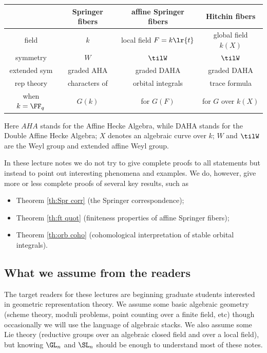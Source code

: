 \begin{table}
	\centering
		\begin{tabular}{|c|c|c|c|}
		\hline
		& Springer fibers & affine  Springer fibers & Hitchin fibers\\
		\hline
		field & $k$ & local field $F=k\lr{t}$ & global field $k(X)$\\
		\hline
		symmetry & $W$ & $\tilW$ &  $\tilW$\\
		\hline
		extended sym& graded AHA & graded DAHA & graded DAHA\\
		\hline
		rep theory & characters of  & orbital integrals &  trace formula \\
		when $k=\FF_{q}$ & $G(k)$ & for $G(F)$ & for $G$ over $k(X)$\\
		\hline
		\end{tabular}
\end{table}
Here $AHA$ stands for the Affine Hecke Algebra, while DAHA stands for the Double Affine Hecke Algebra; $X$ denotes an algebraic curve over $k$; $W$ and $\tilW$ are the Weyl group and extended affine Weyl group. 

In these lecture notes we do not try to give complete proofs to all statements but instead to point out interesting phenomena and examples. We do, however, give more or less complete proofs of several key results, such as 
\begin{itemize}
\item Theorem \ref{th:Spr corr} (the Springer correspondence);
\item Theorem \ref{th:ft quot} (finiteness properties of affine Springer fibers);
\item Theorem \ref{th:orb coho} (cohomological interpretation of stable orbital integrals).
\end{itemize}


\subsection{What we assume from the readers} The target readers for these lectures are beginning graduate students interested in geometric representation theory. We assume some basic algebraic geometry (scheme theory, moduli problems, point counting over a finite field, etc) though occasionally we will use the language of algebraic stacks. We also assume some Lie theory (reductive groups over an algebraic closed field and over a local field), but knowing $\GL_{n}$ and $\SL_{n}$ should be enough to understand most of these notes. 

